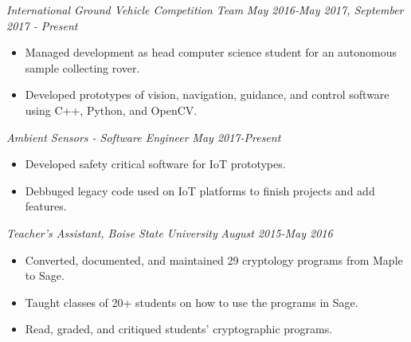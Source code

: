 \documentclass[letterpaper]{article}
\begin{document}
\vspace{.06in}

\begin{multicols}{2}
\textit{International Ground Vehicle Competition Team}
\vfill
\columnbreak
\textit{May 2016-May 2017, September 2017 - Present}
\end{multicols}
\begin{itemize}
    \item Managed development as head computer science student for an autonomous sample collecting rover.
    \item Developed prototypes of vision, navigation, guidance, and control software using C++, Python, and OpenCV. 
\end{itemize}

\begin{multicols}{2}
\textit{Ambient Sensors - Software Engineer}
\vfill
\columnbreak
\textit{May 2017-Present}
\end{multicols}
\begin{itemize}
    \item Developed safety critical software for IoT prototypes.
    \item Debbuged legacy code used on IoT platforms to finish projects and add features.
\end{itemize}

\vspace{.06in}
\begin{multicols}{2}
\textit{ Teacher's Assistant, Boise State University}
\vfill
\columnbreak
\textit{August 2015-May 2016}
\end{multicols}
\begin{itemize}
    \item Converted, documented, and maintained 29 cryptology programs from Maple to Sage.
    \item Taught classes of 20+ students on how to use the programs in Sage.
    \item Read, graded, and critiqued students' cryptographic programs.
\end{itemize}
\end{document}
